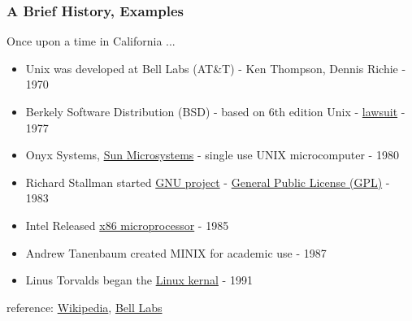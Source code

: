 \documentclass[fleqn]{beamer} %
\newcommand{\sectiontitleII}{A Brief History, Examples}
\begin{document}
	\begin{frame}[label=sectionII] \footnotesize
		\frametitle{\sectiontitleII}
			Once upon a time in California ...\vspc
            \begin{itemize}
                \item Unix was developed at Bell Labs (AT\&T) - Ken Thompson,  Dennis Richie - 1970 
                \item Berkely Software Distribution (BSD) - based on 6th edition Unix - \href{https://en.wikipedia.org/wiki/UNIX_System_Laboratories,_Inc._v._Berkeley_Software_Design,_Inc.}{lawsuit} - 1977
                \item Onyx Systems, \href{https://en.wikipedia.org/wiki/Sun_Microsystems}{Sun Microsystems} - single use UNIX microcomputer - 1980
                \item Richard Stallman started \href{https://en.wikipedia.org/wiki/GNU_Project}{GNU project} - \href{https://en.wikipedia.org/wiki/GNU_General_Public_License}{General Public License (GPL)} - 1983
                \item Intel Released \href{https://en.wikipedia.org/wiki/X86}{x86 microprocessor} - 1985
                \item Andrew Tanenbaum created MINIX for academic use - 1987
                \item Linus Torvalds began the \href{https://en.wikipedia.org/wiki/Linux_kernel}{Linux kernal} - 1991 

            \end{itemize} 
		
		\btVFill
    	\tiny{reference: \href{https://en.wikipedia.org/wiki/History_of_Linux}{Wikipedia}, \href{https://www.bell-labs.com/var/articles/invention-unix/}{Bell Labs}}	
            
	\end{frame}
\end{document}
